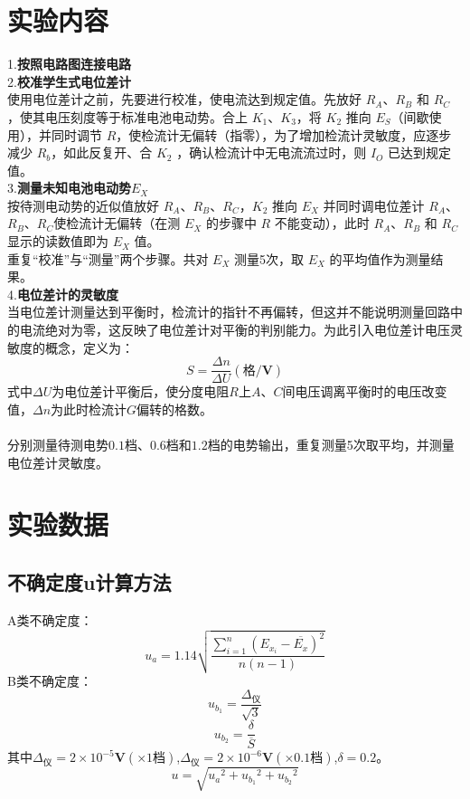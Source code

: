 \documentclass{article}
\begin{document}
\section{实验内容}

1.\textbf{按照电路图连接电路}\\
2.\textbf{校准学生式电位差计}\\
\hspace*{2em}使用电位差计之前，先要进行校准，使电流达到规定值。先放好 \(R_A\)、\(R_B\) 和 \(R_C\)，使其电压刻度等于标准电池电动势。合上 \(K_1\)、\(K_3\)，将 \(K_2\) 推向 \(E_S\)（间歇使用），并同时调节 \(R\)，使检流计无偏转（指零），为了增加检流计灵敏度，应逐步减少 \(R_b\)，如此反复开、合 \(K_2\) ，确认检流计中无电流流过时，则 \(I_O\) 已达到规定值。\\
3.\textbf{测量未知电池电动势$E_X$}\\
\hspace*{2em}按待测电动势的近似值放好 \(R_A\)、\(R_B\)、\(R_C\)，\(K_2\) 推向 \(E_X\) 并同时调电位差计 \(R_A\)、\(R_B\)、\(R_C\)使检流计无偏转（在测 \(E_X\) 的步骤中 \(R\) 不能变动），此时 \(R_A\)、\(R_B\) 和 \(R_C\) 显示的读数值即为 \(E_X\) 值。
\\
\hspace*{2em}重复“校准”与“测量”两个步骤。共对 \(E_X\) 测量5次，取 \(E_X\) 的平均值作为测量结果。\\
4.\textbf{电位差计的灵敏度}\\
\hspace*{2em}当电位差计测量达到平衡时，检流计的指针不再偏转，但这并不能说明测量回路中的电流绝对为零，这反映了电位差计对平衡的判别能力。为此引入电位差计电压灵敏度的概念，定义为：
$$
S=\frac{\Delta n}{\Delta U}(格/\mathbf{V})
$$
式中\(\Delta U\)为电位差计平衡后，使分度电阻\(R\)上\(A\)、\(C\)间电压调离平衡时的电压改变值，\(\Delta n\)为此时检流计\(G\)偏转的格数。
\\
\\
\hspace*{2em}分别测量待测电势\(0.1\)档、\(0.6\)档和\(1.2\)档的电势输出，重复测量5次取平均，并测量电位差计灵敏度。
\section{实验数据}
\subsection{不确定度u计算方法}
\hspace*{2em}A类不确定度：
$$
u_a=1.14\sqrt{\frac{\sum_{i=1}^{n}(E_{x_i}-\overline{E_x})^2}{n(n-1)}}
$$
\hspace*{2em}B类不确定度：
$$
u_{b_1}=\frac{\Delta_{仪}}{\sqrt{3}}
$$
$$
u_{b_2}=\frac{\delta}{ \overline{S} }
$$
\hspace*{2em}其中$\Delta_{仪}=2\times 10^{-5}\mathbf{V}(\times 1档)$,$\Delta_{仪}=2\times 10^{-6}\mathbf{V}(\times 0.1档)$,$\delta=0.2$。
$$
u=\sqrt{{u_a}^2+{u_{b_1}}^2+{u_{b_2}}^2}
$$
\end{document}
